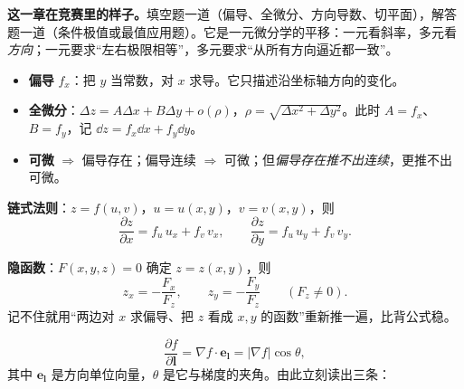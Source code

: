 
\textbf{这一章在竞赛里的样子。}填空题一道（偏导、全微分、方向导数、切平面），解答题一道（条件极值或最值应用题）。它是一元微分学的平移：一元看斜率，多元看\emph{方向}；一元要求“左右极限相等”，多元要求“从所有方向逼近都一致”。


\begin{itemize}[leftmargin=1.6em,itemsep=1pt]
\item \textbf{偏导} $f_x$：把 $y$ 当常数，对 $x$ 求导。它只描述沿坐标轴方向的变化。
\item \textbf{全微分}：$\Delta z=A\Delta x+B\Delta y+o(\rho)$，$\rho=\sqrt{\Delta x^2+\Delta y^2}$。此时 $A=f_x$、$B=f_y$，记 $\dd z=f_x\dd x+f_y\dd y$。
\item \textbf{可微} $\Rightarrow$ 偏导存在；偏导连续 $\Rightarrow$ 可微；但\emph{偏导存在推不出连续}，更推不出可微。
\end{itemize}



\textbf{链式法则}：$z=f(u,v)$，$u=u(x,y)$，$v=v(x,y)$，则
\[
\frac{\partial z}{\partial x}=f_u\,u_x+f_v\,v_x,\qquad
\frac{\partial z}{\partial y}=f_u\,u_y+f_v\,v_y .
\]

\textbf{隐函数}：$F(x,y,z)=0$ 确定 $z=z(x,y)$，则
\[
z_x=-\frac{F_x}{F_z},\qquad z_y=-\frac{F_y}{F_z}\qquad(F_z\ne0).
\]
记不住就用“两边对 $x$ 求偏导、把 $z$ 看成 $x,y$ 的函数”重新推一遍，比背公式稳。


\[
\frac{\partial f}{\partial \boldsymbol l}=\nabla f\cdot \boldsymbol e_{\boldsymbol l}
=|\nabla f|\cos\theta ,
\]
其中 $\boldsymbol e_{\boldsymbol l}$ 是方向单位向量，$\theta$ 是它与梯度的夹角。由此立刻读出三条：

